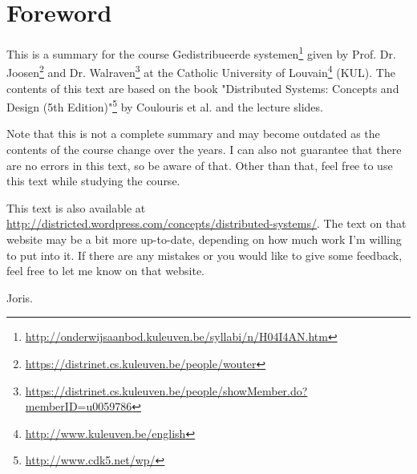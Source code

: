 \chapter*{Foreword}

This is a summary for the course Gedistribueerde systemen\footnote{\url{http://onderwijsaanbod.kuleuven.be/syllabi/n/H04I4AN.htm}} given by Prof. Dr. Joosen\footnote{\url{https://distrinet.cs.kuleuven.be/people/wouter}} and Dr. Walraven\footnote{\url{https://distrinet.cs.kuleuven.be/people/showMember.do?memberID=u0059786}} at the Catholic University of Louvain\footnote{\url{http://www.kuleuven.be/english}} (KUL). The contents of this text are based on the book "Distributed Systems: Concepts and Design (5th Edition)"\footnote{\url{http://www.cdk5.net/wp/}} by Coulouris et al. and the lecture slides.

Note that this is not a complete summary and may become outdated as the contents of the course change over the years. I can also not guarantee that there are no errors in this text, so be aware of that. Other than that, feel free to use this text while studying the course.

This text is also available at \url{http://districted.wordpress.com/concepts/distributed-systems/}. The text on that website may be a bit more up-to-date, depending on how much work I'm willing to put into it. If there are any mistakes or you would like to give some feedback, feel free to let me know on that website.

Joris.